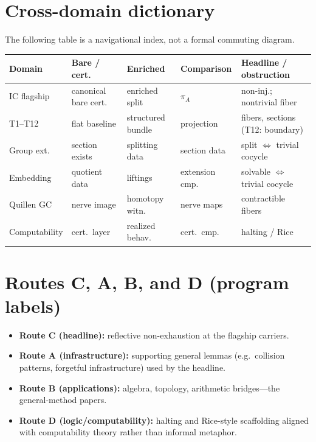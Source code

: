 \documentclass[11pt]{article}
\begin{document}
\section{Cross-domain dictionary}

The following table is a navigational index, not a formal commuting diagram.

\begin{center}
\footnotesize
\setlength{\tabcolsep}{3pt}
\begin{tabular}{@{}>{\raggedright\arraybackslash}p{}>{\raggedright\arraybackslash}p{}>{\raggedright\arraybackslash}p{}>{\raggedright\arraybackslash}p{}>{\raggedright\arraybackslash}p{}@{}}
\toprule
\textbf{Domain} & \textbf{Bare / cert.} & \textbf{Enriched} & \textbf{Comparison} & \textbf{Headline / obstruction} \\
\midrule
IC flagship & canonical bare cert. & enriched split & $\pi_A$ & non-inj.; nontrivial fiber \\
T1--T12 & flat baseline & structured bundle & projection & fibers, sections (T12: boundary) \\
Group ext. & section exists & splitting data & section data & split $\Leftrightarrow$ trivial cocycle \\
Embedding & quotient data & liftings & extension cmp. & solvable $\Leftrightarrow$ trivial cocycle \\
Quillen GC & nerve image & homotopy witn. & nerve maps & contractible fibers \\
Computability & cert.\ layer & realized behav. & cert.\ cmp. & halting / Rice \\
\bottomrule
\end{tabular}
\end{center}

\section{Routes C, A, B, and D (program labels)}

\begin{itemize}[leftmargin=2em]
  \item \textbf{Route C (headline):} reflective non-exhaustion at the flagship carriers.
  \item \textbf{Route A (infrastructure):} supporting general lemmas (e.g.\ collision
    patterns, forgetful infrastructure) used by the headline.
  \item \textbf{Route B (applications):} algebra, topology, arithmetic bridges---the
    general-method papers.
  \item \textbf{Route D (logic/computability):} halting and Rice-style scaffolding aligned
    with computability theory rather than informal metaphor.
\end{itemize}
\end{document}
